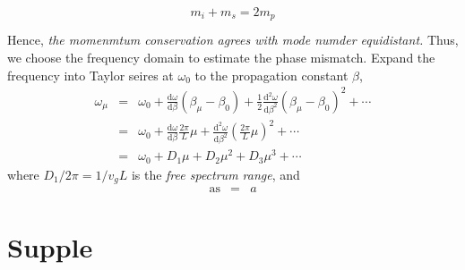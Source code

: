 \documentclass[final]{kuee_en}
\newcommand{\mathd}{\mathrm{d}}
\newcommand{\tmname}[1]{\textsc{#1}}
\newcommand{\tmop}[1]{\ensuremath{\operatorname{#1}}}
\newcommand{\tmtextit}[1]{{\itshape{#1}}}
\begin{document}
{\tmname{\begin{equation}
  m_i + m_s = 2 m_p
\end{equation}}}

Hence, \tmtextit{the momenmtum conservation agrees with mode numder
equidistant.} Thus, we choose the frequency domain to estimate the phase
mismatch. Expand the frequency into Taylor seires at $\omega_0$ to the
propagation constant $\beta$,
\begin{eqnarray}
  \omega_{\mu} & = & \omega_0 + \frac{\mathd \omega}{\mathd \beta}
  (\beta_{\mu} - \beta_0) + \frac{1}{2}  \frac{\mathd^2 \omega}{\mathd
  \beta^2} (\beta_{\mu} - \beta_0)^2 + \cdots \\
  & = & \omega_0 + \frac{\mathd \omega}{\mathd \beta} \frac{2 \pi}{L} \mu +
  \frac{\mathd^2 \omega}{\mathd \beta^2} \left( \frac{2 \pi}{L} \mu \right)^2
  + \cdots \nonumber\\
  & = & \omega_0 + D_1 \mu + D_2 \mu^2 + D_3 \mu^3 + \cdots \nonumber
\end{eqnarray}
where $D_1 / 2 \pi = 1 / v_g L$ is the \tmtextit{free spectrum range}, and
\begin{eqnarray*}
  \tmop{as} & = & a
\end{eqnarray*}




\clearpage %
\clearpage

\appendix

\chapter{Supple}
\end{document}
